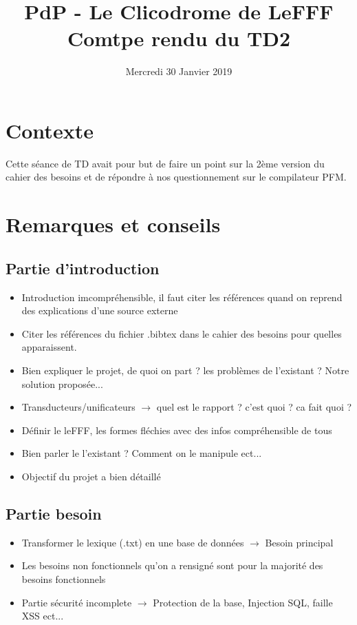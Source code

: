 \documentclass{article}
\title{PdP - Le Clicodrome de LeFFF \\ Comtpe rendu du TD2}
\author{}
\date{Mercredi 30 Janvier 2019}
\begin{document}
\maketitle

\section{Contexte}
Cette séance de TD avait pour but de faire un point sur la 2ème version du cahier des besoins et de répondre à nos questionnement sur le compilateur PFM.

\section{Remarques et conseils}
\subsection{Partie d'introduction}
\begin{itemize}
    \item Introduction imcompréhensible, il faut citer les références quand on reprend des explications d'une source externe
    \item Citer les références du fichier .bibtex dans le cahier des besoins pour quelles apparaissent.
    \item Bien expliquer le projet, de quoi on part ? les problèmes de l'existant ? Notre solution proposée...
    \item Transducteurs/unificateurs $\longrightarrow$ quel est le rapport ? c'est quoi ? ca fait quoi ?
    \item Définir le leFFF, les formes fléchies avec des infos compréhensible de tous
    \item Bien parler le l'existant ? Comment on le manipule ect...
    \item Objectif du projet a bien détaillé
\end{itemize}

\subsection{Partie besoin}
\begin{itemize}
    \item Transformer le lexique (.txt) en une base de données $\longrightarrow$ Besoin principal
    \item Les besoins non fonctionnels qu'on a rensigné sont pour la majorité des besoins fonctionnels
    \item Partie sécurité incomplete $\longrightarrow$ Protection de la base, Injection SQL, faille XSS ect...
\end{itemize}
\end{document}
